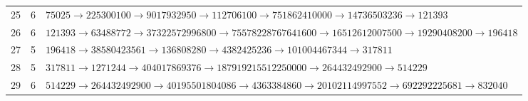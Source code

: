 {\begin{longtable}{@{}rcp{}@{}}
25 & 6 & $75025 \to 225300100 \to 9017932950 \to 112706100 \to 751862410000 \to 14736503236 \to 121393$ \\
26 & 6 & $121393 \to 63488772 \to 37322572996800 \to 75578228767641600 \to 16512612007500 \to 19290408200 \to 196418$ \\
27 & 5 & $196418 \to 38580423561 \to 136808280 \to 4382425236 \to 101004467344 \to 317811$ \\
28 & 5 & $317811 \to 1271244 \to 404017869376 \to 187919215512250000 \to 264432492900 \to 514229$ \\
29 & 6 & $514229 \to 264432492900 \to 40195501804086 \to 4363384860 \to 20102114997552 \to 692292225681 \to 832040$ \\
\bottomrule\end{longtable}}
